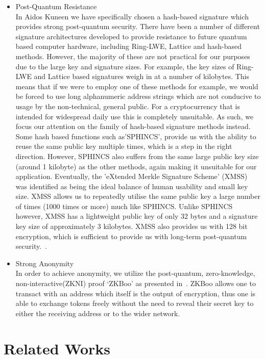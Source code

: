 \documentclass[a4paper,10pt,twocolumn]{article}
\begin{document}
\begin{itemize}
\item{Post-Quantum Resistance}\mbox{}\\ 
In Aidos Kuneen we have specifically chosen a hash-based signature which provides strong post-quantum security. There have been a 
number of different signature architectures developed to provide resistance to future quantum based computer hardware, including 
Ring-LWE, Lattice and hash-based methods. However, the majority of these are not practical for our purposes due to the large key and 
signature sizes. For example, the key sizes of Ring-LWE and Lattice based signatures weigh in at a number of kilobytes. This means that 
if we were to employ one of these methods for example, we would be forced to use long alphanumeric address strings which are not 
conducive to usage by the non-technical, general public. For a cryptocurrency that is intended for widespread daily use this is 
completely unsuitable. As such, we focus our attention on the family of hash-based signature methods instead. Some hash based functions 
such as'SPHINCS', provide us with the ability to reuse the same public key multiple times, which is a step in the right direction. 
However, SPHINCS also suffers from the same large public key size (around 1 kilobyte) as the other methods, again making it unsuitable 
for our application. Eventually, the 'eXtended Merkle Signature Scheme' (XMSS) was identified as being the ideal balance of human 
usability and small key size. XMSS allows us to repeatedly utilise the same public key a large number of times (1000 times or more) much 
like SPHINCS. Unlike SPHINCS however, XMSS has a lightweight public key of only 32 bytes and a signature key size of approximately 3 
kilobytes. XMSS also provides us with 128 bit encryption, which is sufficient to provide us with long-term post-quantum 
security.~\cite{recom}.

\item{Strong Anonymity}\mbox{}\\ 
In order to achieve anonymity, we utilize the post-quantum, zero-knowledge, non-interactive(ZKNI) proof `ZKBoo' as presented 
in~\cite{zkboo}. ZKBoo allows one to transact with an address which itself is the output of encryption, thus one is able to exchange 
tokens freely without the need to reveal their secret key to either the receiving address or to the wider network.
\end{itemize}

\section{Related Works}
\end{document}
